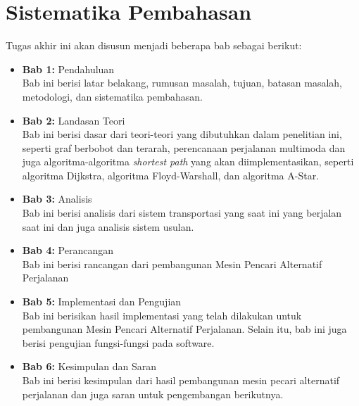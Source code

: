 \section{Sistematika Pembahasan}
\label{sec:sispem}
Tugas akhir ini akan disusun menjadi beberapa bab sebagai berikut:
\begin{itemize}
    \item \textbf{Bab 1:} Pendahuluan
    \\ Bab ini berisi latar belakang, rumusan masalah, tujuan, batasan masalah, metodologi, dan sistematika pembahasan.
    \item \textbf{Bab 2:} Landasan Teori
    \\ Bab ini berisi dasar dari teori-teori yang dibutuhkan dalam penelitian ini, seperti graf berbobot dan terarah, perencanaan perjalanan multimoda  dan juga algoritma-algoritma \textit{shortest path} yang akan diimplementasikan, seperti algoritma Dijkstra, algoritma Floyd-Warshall, dan algoritma A-Star.
    \item \textbf{Bab 3:} Analisis
    \\ Bab ini berisi analisis dari sistem transportasi yang saat ini yang berjalan saat ini dan juga analisis sistem usulan.  
    \item \textbf{Bab 4:} Perancangan
    \\ Bab ini berisi rancangan dari pembangunan Mesin Pencari Alternatif Perjalanan
    \item \textbf{Bab 5:} Implementasi dan Pengujian
    \\ Bab ini berisikan hasil implementasi yang telah dilakukan untuk pembangunan Mesin Pencari Alternatif Perjalanan. Selain itu, bab ini juga berisi pengujian fungsi-fungsi pada software.
    \item \textbf{Bab 6:} Kesimpulan dan Saran
    \\ Bab ini berisi kesimpulan dari hasil pembangunan mesin pecari alternatif perjalanan dan juga saran untuk pengembangan berikutnya.
        
\end{itemize}